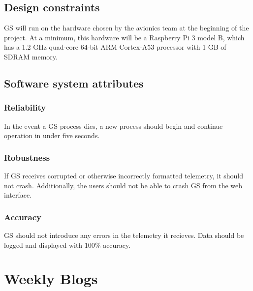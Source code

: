 \documentclass[10pt,draftclsnofoot,onecolumn]{IEEEtran}
\begin{document}
	\subsection{Design constraints}
	GS will run on the hardware chosen by the avionics team at the beginning of the project.
	At a minimum, this hardware will be a Raspberry Pi 3 model B, which has a 1.2 GHz quad-core 64-bit ARM Cortex-A53 processor
	with 1 GB of SDRAM memory.

	\subsection{Software system attributes}

	\subsubsection{Reliability}
	In the event a GS process dies, a new process should begin and continue operation in under five seconds.

	\subsubsection{Robustness}
	If GS receives corrupted or otherwise incorrectly formatted telemetry, it should not crash.
	Additionally, the users should not be able to crash GS from the web interface.

	\subsubsection{Accuracy}
	GS should not introduce any errors in the telemetry it recieves.
	Data should be logged and displayed with 100\% accuracy.

\printindex





























\section{Weekly Blogs}
\end{document}

